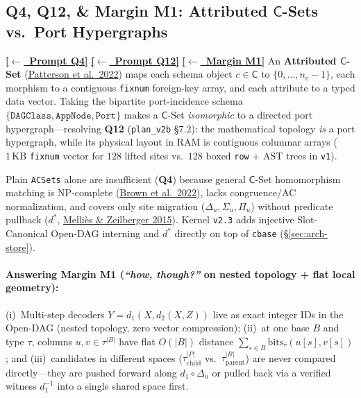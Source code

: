 \documentclass[12pt]{article}
\newcommand{\ansback}[2]{\hyperlink{#1}{\textcolor{qpurple}{\textbf{\small[\(\leftarrow\)~#2]}}}}
\newcommand{\litref}[2]{\hyperlink{lit:#1}{\textcolor{citegreen}{#2}}}
\begin{document}
\subsection{Q4, Q12, \& Margin M1: Attributed \texorpdfstring{$\mathsf{C}$}{C}-Sets vs.\ Port Hypergraphs}
\label{ans:4}
\label{ans:12}

\ansback{q:4}{Prompt Q4} \ansback{q:12}{Prompt Q12} \ansback{q:m1}{Margin M1}
An \textbf{Attributed $\mathsf{C}$-Set} (\litref{patterson2022}{Patterson et al.\ 2022}) maps each schema object $c \in \mathsf{C}$ to $\{0,\dots,n_c-1\}$, each morphism to a contiguous \texttt{fixnum} foreign-key array, and each attribute to a typed data vector. Taking the bipartite port-incidence schema $\{\texttt{DAGClass}, \texttt{AppNode}, \texttt{Port}\}$ makes a $\mathsf{C}$-Set \emph{isomorphic} to a directed port hypergraph---resolving \textbf{Q12} (\texttt{plan\_v2b} \S7.2): the mathematical topology \emph{is} a port hypergraph, while its physical layout in RAM is contiguous columnar arrays ($1\,\mathrm{KB}$ \texttt{fixnum} vector for $128$ lifted sites vs.\ $128$ boxed \texttt{row} + AST trees in \texttt{v1}).

Plain \texttt{ACSets} alone are insufficient (\textbf{Q4}) because general $\mathsf{C}$-Set homomorphism matching is NP-complete (\litref{brown2022}{Brown et al.\ 2022}), lacks congruence/AC normalization, and covers only site migration ($\Delta_u, \Sigma_u, \Pi_u$) without predicate pullback ($d^*$, \litref{mellies2015}{Melli\`es \& Zeilberger 2015}). Kernel \texttt{v2.3} adds injective Slot-Canonical Open-DAG interning and $d^*$ directly on top of \texttt{cbase} (\S\ref{sec:arch-store}).

\paragraph{Answering Margin M1 (\emph{``how, though?''} on nested topology + flat local geometry):}
(i)~Multi-step decoders $Y = d_1(X, d_2(X, Z))$ live as exact integer IDs in the Open-DAG (nested topology, zero vector compression);
(ii)~at one base $B$ and type $\tau$, columns $u, v \in \tau^{|B|}$ have flat $O(|B|)$ distance $\sum_{s\in B} \mathrm{bits}_\tau(u[s], v[s])$; and
(iii)~candidates in different spaces ($\tau_{\mathrm{child}}^{|P|}$ vs.\ $\tau_{\mathrm{parent}}^{|R|}$) are never compared directly---they are pushed forward along $d_1 \circ \Delta_u$ or pulled back via a verified witness $d_1^{-1}$ into a single shared space first.
\end{document}
